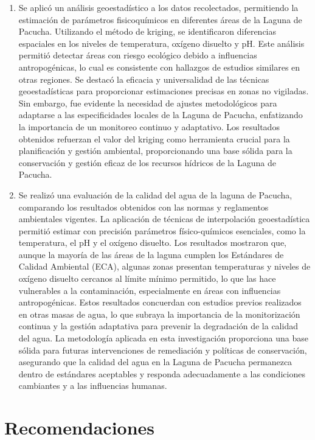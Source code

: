 \begin{enumerate}
    \item Se aplicó un análisis geoestadístico a los datos recolectados, permitiendo la estimación de parámetros fisicoquímicos en diferentes áreas de la Laguna de Pacucha. Utilizando el método de kriging, se identificaron diferencias espaciales en los niveles de temperatura, oxígeno disuelto y pH. Este análisis permitió detectar áreas con riesgo ecológico debido a influencias antropogénicas, lo cual es consistente con hallazgos de estudios similares en otras regiones. Se destacó la eficacia y universalidad de las técnicas geoestadísticas para proporcionar estimaciones precisas en zonas no vigiladas. Sin embargo, fue evidente la necesidad de ajustes metodológicos para adaptarse a las especificidades locales de la Laguna de Pacucha, enfatizando la importancia de un monitoreo continuo y adaptativo. Los resultados obtenidos refuerzan el valor del kriging como herramienta crucial para la planificación y gestión ambiental, proporcionando una base sólida para la conservación y gestión eficaz de los recursos hídricos de la Laguna de Pacucha.
    \item Se realizó una evaluación de la calidad del agua de la laguna de Pacucha, comparando los resultados obtenidos con las normas y reglamentos ambientales vigentes. La aplicación de técnicas de interpolación geoestadística permitió estimar con precisión parámetros físico-químicos esenciales, como la temperatura, el pH y el oxígeno disuelto. Los resultados mostraron que, aunque la mayoría de las áreas de la laguna cumplen los Estándares de Calidad Ambiental (ECA), algunas zonas presentan temperaturas y niveles de oxígeno disuelto cercanos al límite mínimo permitido, lo que las hace vulnerables a la contaminación, especialmente en áreas con influencias antropogénicas. Estos resultados concuerdan con estudios previos realizados en otras masas de agua, lo que subraya la importancia de la monitorización continua y la gestión adaptativa para prevenir la degradación de la calidad del agua. La metodología aplicada en esta investigación proporciona una base sólida para futuras intervenciones de remediación y políticas de conservación, asegurando que la calidad del agua en la Laguna de Pacucha permanezca dentro de estándares aceptables y responda adecuadamente a las condiciones cambiantes y a las influencias humanas.
\end{enumerate}


\section{Recomendaciones}

